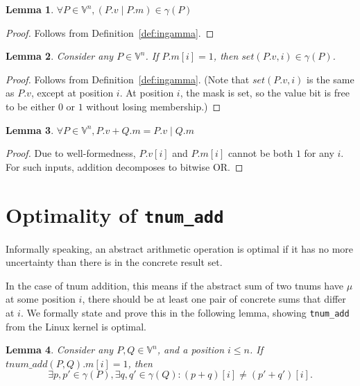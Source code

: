 \documentclass{article}
\newtheorem{lemma}{Lemma}
\newcommand{\wfdomn}{\mathbb{V}^{n}}
\newcommand{\ith}[1]{#1[i]}
\newcommand{\tv}[1]{#1.v}
\newcommand{\tm}[1]{#1.m}
\newcommand{\ithv}[1]{\ith{\tv{#1}}}
\newcommand{\ithm}[1]{\ith{\tm{#1}}}
\newcommand{\ingamma}[2]{#1 \in \gamma(#2)}
\newcommand{\tadd}[2]{tnum\_add(#1, #2)}
\newcommand{\seti}[1]{set(#1, i)}
\newcommand{\orvm}[1]{(\tv{#1} \mathbin{|} \tm{#1})}
\begin{document}
\begin{lemma}
  \label{lem:ingamma_value_bitor_mask}
  $\forall P \in \wfdomn, \ingamma{\orvm{P}}{P}$
\end{lemma}
\begin{proof}
  Follows from Definition~\ref{def:ingamma}.
\end{proof}

\begin{lemma}
  \label{lem:ingamma_set_at_mask}
  Consider any $P \in \wfdomn$. If $\ithm{P} = 1$, then $\ingamma{\seti{\tv{P}}}{P}$.
\end{lemma}
\begin{proof}
  Follows from Definition~\ref{def:ingamma}. (Note that
  $\seti{\tv{P}}$ is the same as $\tv{P}$, except at position $i$. At
  position $i$, the mask is set, so the value bit is free to be either
  $0$ or $1$ without losing membership.)
\end{proof}

\begin{lemma}
  \label{lem:tnum_add_v_m_is_or}
  $\forall P \in \wfdomn, \tv{P} + \tm{Q} = \tv{P} \mathbin{|} \tm{Q}$
\end{lemma}
\begin{proof}
  Due to well-formedness, $\ithv{P}$ and $\ithm{P}$ cannot be both $1$
  for any $i$. For such inputs, addition decomposes to bitwise OR.
\end{proof}

\section{Optimality of \lstinline{tnum_add}}

Informally speaking, an abstract arithmetic operation is optimal if it
has no more uncertainty than there is in the concrete result set.

In the case of tnum addition, this means if the abstract sum of two
tnums have $\mu$ at some position $i$, there should be at least one
pair of concrete sums that differ at $i$. We formally state and prove
this in the following lemma, showing \lstinline{tnum_add} from the
Linux kernel is optimal.

\begin{lemma}
  Consider any $P, Q \in \wfdomn$, and a position $i \le n$. If $\ithm{\tadd{P}{Q}} = 1$, then
  \[
  \exists \ingamma{p, p'}{P}, \exists \ingamma{q, q'}{Q} : \ith{(p + q)} \neq \ith{(p' + q')}.
  \]
\end{lemma}
\end{document}
